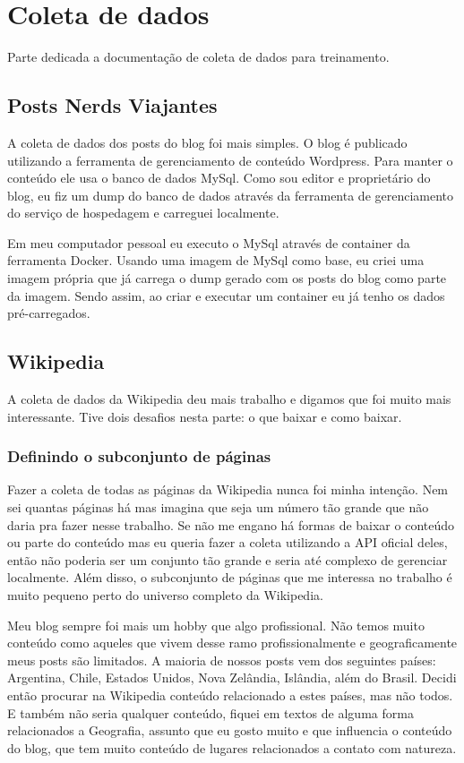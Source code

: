 \section{Coleta de dados}

Parte dedicada a documentação de coleta de dados para treinamento.

\subsection{Posts Nerds Viajantes}

A coleta de dados dos posts do blog foi mais simples. O blog é publicado utilizando a ferramenta de gerenciamento de conteúdo Wordpress. Para manter 
o conteúdo ele usa o banco de dados MySql. Como sou editor e proprietário do blog, eu fiz um dump do banco de dados através da ferramenta de 
gerenciamento do serviço de hospedagem e carreguei localmente.

Em meu computador pessoal eu executo o MySql através de container da ferramenta Docker. Usando uma imagem de MySql como base, eu criei uma imagem própria 
que já carrega o dump gerado com os posts do blog como parte da imagem. Sendo assim, ao criar e executar um container eu já tenho os dados pré-carregados.


\subsection{Wikipedia}

A coleta de dados da Wikipedia deu mais trabalho e digamos que foi muito mais interessante. Tive dois desafios nesta parte: o que baixar e como baixar.

\subsubsection{Definindo o subconjunto de páginas}

Fazer a coleta de todas as páginas da Wikipedia nunca foi minha intenção. Nem sei quantas páginas há mas imagina que seja um número tão grande que não daria pra fazer nesse trabalho. Se não me engano há formas de baixar o conteúdo ou parte do conteúdo mas eu queria fazer a coleta utilizando a API oficial deles, então não poderia ser um conjunto tão grande e seria até complexo de gerenciar localmente. Além disso, o subconjunto de páginas que me interessa no trabalho é muito pequeno perto do universo completo da Wikipedia.

Meu blog sempre foi mais um hobby que algo profissional. Não temos muito conteúdo como aqueles que vivem desse ramo profissionalmente e geograficamente meus posts são limitados. A maioria de nossos posts vem dos seguintes países: Argentina, Chile, Estados Unidos, Nova Zelândia, Islândia, além do Brasil. Decidi então procurar na Wikipedia conteúdo relacionado a estes países, mas não todos. E também não seria qualquer conteúdo, fiquei em textos de alguma forma relacionados a Geografia, assunto que eu gosto muito e que influencia o conteúdo do blog, que tem muito conteúdo de lugares relacionados a contato com natureza.

